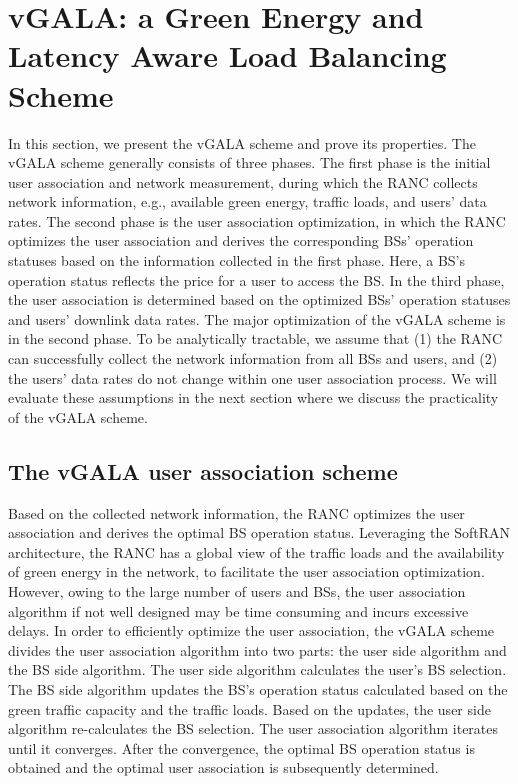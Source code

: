 \documentclass[journal]{IEEEtran}
\theoremstyle{definition}
\begin{document}
\section{vGALA: a Green Energy and Latency Aware Load Balancing Scheme}
\label{sec:distributed_scheme}
In this section, we present the vGALA scheme and prove its properties. The vGALA scheme generally consists of three phases. The first phase is the initial user association and network measurement, during which the RANC collects network information, e.g., available green energy, traffic loads, and users' data rates. The second phase is the user association optimization, in which the RANC optimizes the user association and derives the corresponding BSs' operation statuses based on the information collected in the first phase. Here, a BS's operation status reflects the price for a user to access the BS. In the third phase, the user association is determined based on the optimized BSs' operation statuses and users' downlink data rates. The major optimization of the vGALA scheme is in the second phase. To be analytically tractable, we assume that (1) the RANC can successfully collect the network information from all BSs and users, and (2) the users' data rates do not change within one user association process. We will evaluate these assumptions in the next section where we discuss the practicality of the vGALA scheme.

\subsection{The vGALA user association scheme}
Based on the collected network information, the RANC optimizes the user association and derives the optimal BS operation status. Leveraging the SoftRAN architecture, the RANC has a global view of the traffic loads and the availability of green energy in the network, to facilitate the user association optimization. However, owing to the large number of users and BSs, the user association algorithm if not well designed may be time consuming and incurs excessive delays. In order to efficiently optimize the user association, the vGALA scheme divides the user association algorithm into two parts: the user side algorithm and the BS side algorithm. The user side algorithm calculates the user's BS selection. The BS side algorithm updates the BS's operation status calculated based on the green traffic capacity and the traffic loads. Based on the updates, the user side algorithm re-calculates the BS selection. The user association algorithm iterates until it converges. After the convergence, the optimal BS operation status is obtained and the optimal user association is subsequently determined.
\end{document}
